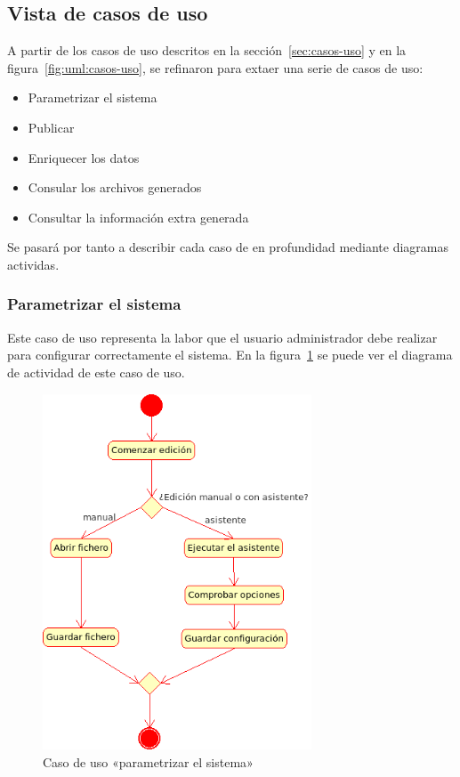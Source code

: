 
\subsection{Vista de casos de uso}

A partir de los casos de uso descritos en la sección~\ref{sec:casos-uso} y 
en la figura~\ref{fig:uml:casos-uso}, se refinaron para extaer una serie 
de casos de uso:

\begin{itemize}
 \item Parametrizar el sistema
 \item Publicar
 \item Enriquecer los datos
 \item Consular los archivos generados
 \item Consultar la información extra generada
\end{itemize}

Se pasará por tanto a describir cada caso de en profundidad mediante diagramas
actividas.

\subsubsection{Parametrizar el sistema}

Este caso de uso representa la labor que el usuario administrador debe realizar 
para configurar correctamente el sistema. En la figura~\ref{fig:uml:parametrizar-sistema}
se puede ver el diagrama de actividad de este caso de uso.

\begin{figure}[ht]
 	\centering
	\includegraphics[width=8cm]{images/uml/casos-uso/parametrizar-sistema.png}
	\caption{Caso de uso «parametrizar el sistema»}
	\label{fig:uml:parametrizar-sistema}
\end{figure}

